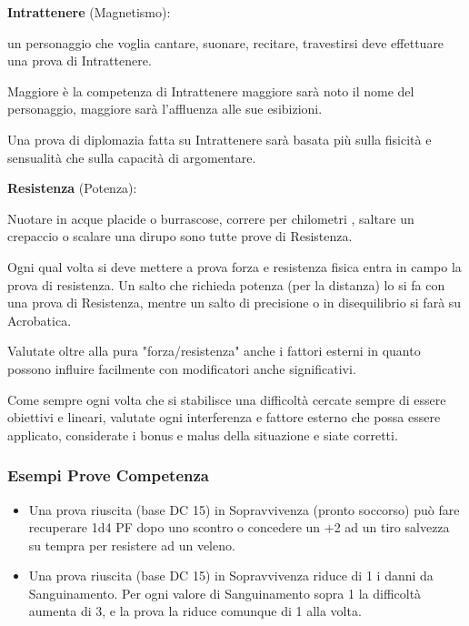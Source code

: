 \documentclass[a4paper,11pt,twoside,openany]{book}
\begin{document}
\textbf{Intrattenere} (Magnetismo):

un personaggio che voglia cantare, suonare, recitare, travestirsi deve effettuare una prova di Intrattenere.

Maggiore è la competenza di Intrattenere maggiore sarà noto il nome del personaggio, maggiore sarà l'affluenza alle sue esibizioni.

Una prova di diplomazia fatta su Intrattenere sarà basata più sulla fisicità e sensualità che sulla capacità di argomentare.

\textbf{Resistenza} (Potenza):

Nuotare in acque placide o burrascose, correre per chilometri , saltare un crepaccio o scalare una dirupo sono tutte prove di Resistenza.

Ogni qual volta si deve mettere a prova forza e resistenza fisica entra in campo la prova di resistenza.
Un salto che richieda potenza (per la distanza) lo si fa con una prova di Resistenza, mentre un salto di precisione o in disequilibrio si farà su Acrobatica.

Valutate oltre alla pura "forza/resistenza" anche i fattori esterni in quanto possono influire facilmente con modificatori anche significativi.

\bigskip

Come sempre ogni volta che si stabilisce una difficoltà cercate sempre di essere obiettivi e lineari, valutate ogni interferenza e fattore esterno che possa essere applicato, considerate i bonus e malus della situazione e siate corretti.

\subsubsection{Esempi Prove Competenza}

\label{esempi-prove-competenza}

\begin{itemize}
	\item Una prova riuscita (base DC 15) in Sopravvivenza (pronto soccorso) può fare recuperare 1d4 PF dopo uno scontro o concedere un +2 ad un tiro salvezza su tempra per resistere ad un veleno.
	\item Una prova riuscita (base DC 15) in Sopravvivenza riduce di 1 i danni da Sanguinamento. Per ogni valore di Sanguinamento sopra 1 la difficoltà aumenta di 3, e la prova la riduce comunque di 1 alla volta.
\end{itemize}
\end{document}
